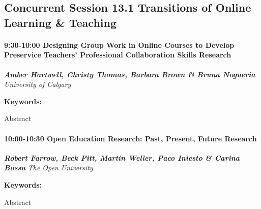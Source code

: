 \documentclass[
]{book}
\begin{document}
\hypertarget{concurrent-session-13.1-transitions-of-online-learning-teaching}{%
\subsection*{Concurrent Session 13.1 \textbar{} Transitions of Online Learning \& Teaching}\label{concurrent-session-13.1-transitions-of-online-learning-teaching}}

\begin{session}
\hypertarget{designing-group-work-in-online-courses-to-develop-preservice-teachers-professional-collaboration-skills-research}{%
\paragraph*{\texorpdfstring{9:30-10:00 \textbar{} \textbf{Designing
Group Work in Online Courses to Develop Preservice Teachers'
Professional Collaboration Skills} \textbar{}
Research}{9:30-10:00 \textbar{} Designing Group Work in Online Courses to Develop Preservice Teachers' Professional Collaboration Skills \textbar{} Research}}\label{designing-group-work-in-online-courses-to-develop-preservice-teachers-professional-collaboration-skills-research}}

\textbf{\emph{Amber Hartwell, Christy Thomas, Barbara Brown \& Bruna
Nogueria}} \textbar{} \emph{University of Calgary}

\textbf{Keywords:}

Abstract
\end{session}

\begin{session}
\hypertarget{open-education-research-past-present-future-research}{%
\paragraph*{\texorpdfstring{10:00-10:30 \textbar{} \textbf{Open
Education Research: Past, Present, Future} \textbar{}
Research}{10:00-10:30 \textbar{} Open Education Research: Past, Present, Future \textbar{} Research}}\label{open-education-research-past-present-future-research}}

\textbf{\emph{Robert Farrow, Beck Pitt, Martin Weller, Paco Iniesto \&
Carina Bossu}} \textbar{} \emph{The Open University}

\textbf{Keywords:}

Abstract
\end{session}
\end{document}
